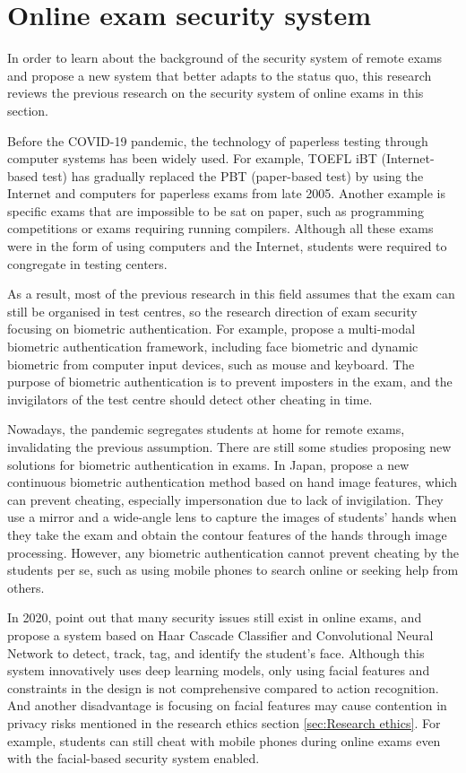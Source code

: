 \section{Online exam security system}
\label{sec:Online exam security system}
In order to learn about the background of the security system of remote exams and propose a new system that better adapts to the status quo, this research reviews the previous research on the security system of online exams in this section.

Before the COVID-19 pandemic, the technology of paperless testing through computer systems has been widely used. For example, TOEFL iBT (Internet-based test) has gradually replaced the PBT (paper-based test) by using the Internet and computers for paperless exams from late 2005.
Another example is specific exams that are impossible to be sat on paper, such as programming competitions or exams requiring running compilers.
Although all these exams were in the form of using computers and the Internet, students were required to congregate in testing centers.

As a result, most of the previous research in this field assumes that the exam can still be organised in test centres, so the research direction of exam security focusing on biometric authentication.
For example, \citet{traore2017ensuring} propose a multi-modal biometric authentication framework, including face biometric and dynamic biometric from computer input devices, such as mouse and keyboard.
The purpose of biometric authentication is to prevent imposters in the exam, and the invigilators of the test centre should detect other cheating in time.

Nowadays, the pandemic segregates students at home for remote exams, invalidating the previous assumption.
There are still some studies proposing new solutions for biometric authentication in exams. 
In Japan, \citet{Akiko202144107} propose a new continuous biometric authentication method based on hand image features, which can prevent cheating, especially impersonation due to lack of invigilation. 
They use a mirror and a wide-angle lens to capture the images of students' hands when they take the exam and obtain the contour features of the hands through image processing.
However, any biometric authentication cannot prevent cheating by the students per se, such as using mobile phones to search online or seeking help from others.

In 2020, \citet{garg2020convolutional} point out that many security issues still exist in online exams, and propose a system based on Haar Cascade Classifier and Convolutional Neural Network to detect, track, tag, and identify the student's face.
Although this system innovatively uses deep learning models, only using facial features and constraints in the design is not comprehensive compared to action recognition.
And another disadvantage is focusing on facial features may cause contention in privacy risks mentioned in the research ethics section \ref{sec:Research ethics}.
For example, students can still cheat with mobile phones during online exams even with the facial-based security system enabled.

